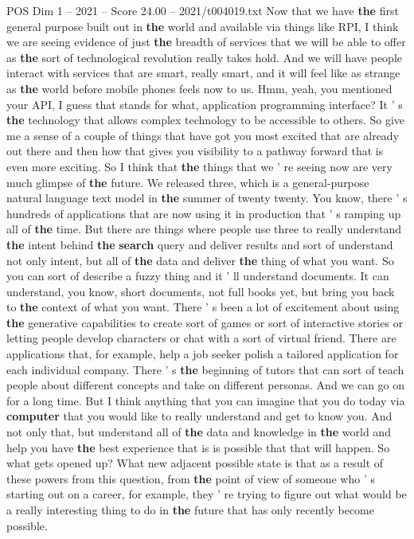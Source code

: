 \begin{textsample}{POS Dim 1 – 2021 – Score 24.00 – 2021/t004019.txt}
Now that we have \textbf{the} first general purpose built out in \textbf{the} world and available via things like RPI, I think we are seeing evidence of just \textbf{the} breadth of services that we will be able to offer as \textbf{the} sort of technological revolution really takes hold.
And we will have people interact with services that are smart, really smart, and it will feel like as strange as \textbf{the} world before mobile phones feels now to us.
Hmm, yeah, you mentioned your API, I guess that stands for what, application programming interface?
It ' s \textbf{the} technology that allows complex technology to be accessible to others.
So give me a sense of a couple of things that have got you most excited that are already out there and then how that gives you visibility to a pathway forward that is even more exciting.
So I think that \textbf{the} things that we ' re seeing now are very much glimpse of \textbf{the} future.
We released three, which is a general-purpose natural language text model in \textbf{the} summer of twenty twenty.
You know, there ' s hundreds of applications that are now using it in production that ' s ramping up all of \textbf{the} time.
But there are things where people use three to really understand \textbf{the} intent behind \textbf{the} \textbf{search} query and deliver results and sort of understand not only intent, but all of \textbf{the} data and deliver \textbf{the} thing of what you want.
So you can sort of describe a fuzzy thing and it ' ll understand documents.
It can understand, you know, short documents, not full books yet, but bring you back to \textbf{the} context of what you want.
There ' s been a lot of excitement about using \textbf{the} generative capabilities to create sort of games or sort of interactive stories or letting people develop characters or chat with a sort of virtual friend.
There are applications that, for example, help a job seeker polish a tailored application for each individual company.
There ' s \textbf{the} beginning of tutors that can sort of teach people about different concepts and take on different personas.
And we can go on for a long time.
But I think anything that you can imagine that you do today via \textbf{computer} that you would like to really understand and get to know you.
And not only that, but understand all of \textbf{the} data and knowledge in \textbf{the} world and help you have \textbf{the} best experience that is is possible that that will happen.
So what gets opened up?
What new adjacent possible state is that as a result of these powers from this question, from \textbf{the} point of view of someone who ' s starting out on a career, for example, they ' re trying to figure out what would be a really interesting thing to do in \textbf{the} future that has only recently become possible.

\end{textsample}
